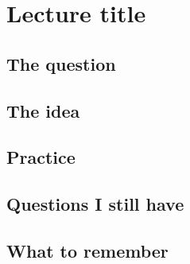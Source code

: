 
\chapter{Lecture title}
\label{ch:short-name}


\section{The question}

\section{The idea}

\section{Practice}

\section{Questions I still have}

\section{What to remember}
